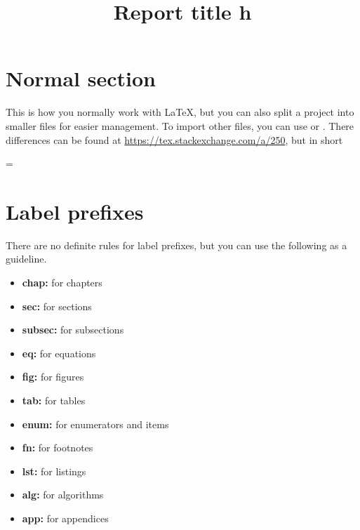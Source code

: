 \documentclass[twoside,final]{Phenikaa-report}
\title{Report title h}
\begin{document}
\coverpage%


\tableofcontents
\listoffigures
\listoftables
\lstlistoflistings{}

\clearpage
\section{Normal section}
This is how you normally work with \LaTeX, but you can also split a project into smaller files for easier management.
To import other files, you can use \texttt{} or \texttt{}.
There differences can be found at \url{https://tex.stackexchange.com/a/250}, but in short

\begin{center}
  \texttt{} = \texttt{\clearpage  \clearpage}
\end{center}

\section{Label prefixes}
There are no definite rules for label prefixes, but you can use the following as a guideline.
\begin{itemize}
  \item \textbf{chap:} for chapters
  \item \textbf{sec:} for sections
  \item \textbf{subsec:} for subsections
  \item \textbf{eq:} for equations
  \item \textbf{fig:} for figures
  \item \textbf{tab:} for tables
  \item \textbf{enum:} for enumerators and items
  \item \textbf{fn:} for footnotes
  \item \textbf{lst:} for listings
  \item \textbf{alg:} for algorithms
  \item \textbf{app:} for appendices
\end{itemize}
\end{document}
